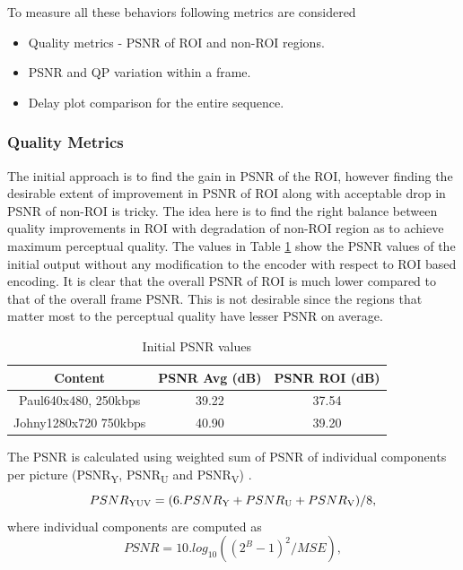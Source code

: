 \documentclass[11pt]{article} %
\begin{document}
To measure all these behaviors following metrics are considered
\begin{itemize}  
\item Quality metrics - PSNR of ROI and non-ROI regions.
\item PSNR and QP variation within a frame.
\item Delay plot comparison for the entire sequence.
\end{itemize}
\subsubsection{Quality Metrics} \label{sec:setup-PSNR}
The initial approach is to find the gain in PSNR of the ROI, however finding the desirable extent of improvement in PSNR of ROI along with acceptable drop in PSNR of non-ROI is tricky. The idea here is to find the right balance between quality improvements in ROI with degradation of non-ROI region as to achieve maximum perceptual quality. The values in Table \ref{InitPSNR1} show the PSNR values of the initial output without any modification to the encoder with respect to ROI based encoding. It is clear that the overall PSNR of ROI is much lower compared to that of the overall frame PSNR. This is not desirable since the regions that matter most to the perceptual quality have lesser PSNR on average.

\begin{table} [h!]
\centering
\begin{tabular}{ |c|c|c| }
 \hline
Content & PSNR Avg (dB) & PSNR ROI (dB) \\
 \hline 
 Paul640x480, 250kbps & 39.22 & 37.54 \\ 
 Johny1280x720 750kbps & 40.90 & 39.20 \\  
 \hline
\end{tabular}
 \caption{Initial PSNR values}
 \label{InitPSNR1}
\end{table}

The PSNR is calculated using weighted sum of PSNR of individual components per picture (PSNR\textsubscript{Y}, PSNR\textsubscript{U} and PSNR\textsubscript{V}) \cite{ComparingCodingEfficiency}.
\begin{equation}
\label{Eq:PSNR}
PSNR\textsubscript{YUV} = ( 6 . PSNR\textsubscript{Y} + PSNR\textsubscript{U} + PSNR\textsubscript{V}) / 8,
\end{equation}
 where individual components are computed as
\begin{equation}
\label{Eq:PSNRDef}
PSNR = 10 . log_{10}((2^B - 1)^2 / MSE),
\end{equation}
\end{document}
